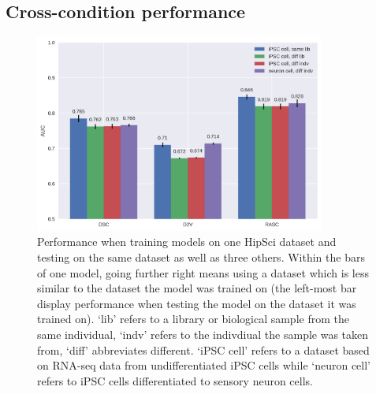 



\subsection{Cross-condition performance} \label{subsec:hipsci_ipsc_majiq}

\begin{figure}
	\centering\includegraphics[width=0.85\textwidth]{../visualizations/ch5-results/majiq_comparison_barcharts.png} 
	\caption{Performance when training models on one HipSci dataset and testing on the same dataset as well as three others. Within the bars of one model, going further right means using a dataset which is less similar to the dataset the model was trained on (the left-most bar display performance when testing the model on the dataset it was trained on). `lib' refers to a library or biological sample from the same individual, `indv' refers to the indivdiual the sample was taken from, `diff' abbreviates different. `iPSC cell' refers to a dataset based on RNA-seq data from undifferentiated iPSC cells while `neuron cell' refers to iPSC cells differentiated to sensory neuron cells. }
	\label{fig:majiq_comparison_barcharts}
\end{figure}


